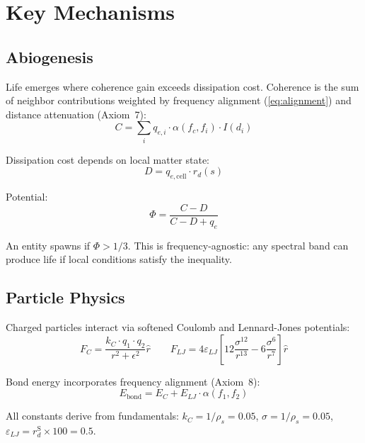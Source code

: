 \documentclass[11pt,a4paper]{article}
\begin{document}
\section{Key Mechanisms}
\label{sec:mechanisms}

\subsection{Abiogenesis}

Life emerges where coherence gain exceeds dissipation cost.
Coherence is the sum of neighbor contributions weighted by
frequency alignment (\cref{eq:alignment}) and distance
attenuation (Axiom~7):
\begin{equation}
  C = \sum_i q_{e,i} \cdot \alpha(f_c, f_i) \cdot I(d_i)
\end{equation}

Dissipation cost depends on local matter state:
\begin{equation}
  D = q_{e,\text{cell}} \cdot r_d(s)
\end{equation}

Potential:
\begin{equation}
  \Phi = \frac{C - D}{C - D + q_e}
\end{equation}

An entity spawns if $\Phi > 1/3$.
This is frequency-agnostic: any spectral band can produce
life if local conditions satisfy the inequality.

\subsection{Particle Physics}

Charged particles interact via softened Coulomb and
Lennard-Jones potentials:
\begin{equation}
  F_C = \frac{k_C \cdot q_1 \cdot q_2}{r^2 + \epsilon^2} \hat{r}
  \qquad
  F_{LJ} = 4\varepsilon_{LJ}\!\left[
    12\frac{\sigma^{12}}{r^{13}} - 6\frac{\sigma^6}{r^7}
  \right]\hat{r}
\end{equation}

Bond energy incorporates frequency alignment (Axiom~8):
\begin{equation}
  E_{\text{bond}} = E_C + E_{LJ} \cdot \alpha(f_1, f_2)
\end{equation}

All constants derive from fundamentals:
$k_C = 1/\rho_s = 0.05$,\quad
$\sigma = 1/\rho_s = 0.05$,\quad
$\varepsilon_{LJ} = r_d^{\text{S}} \times 100 = 0.5$.
\end{document}
